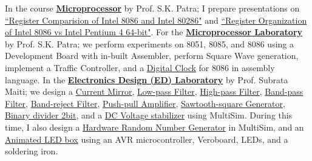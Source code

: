 In the course \textbf{\href{https://github.com/nitrece/microprocessor}{Microprocessor}} by Prof. S.K. Patra; I prepare presentations on \href{https://github.com/nitrece/microprocessor/blob/main/Presentations/01.%20Register%20Comparision%20of%20Intel%208086%20and%20Intel%2080286.pdf}{``Register Comparision of Intel 8086 and Intel 80286"} and \href{https://github.com/nitrece/microprocessor/blob/main/Presentations/02.%20Register%20Organization%20of%20Intel%208086%20vs%20Intel%20Pentium%204%2064-bit.pdf}{``Register Organization of Intel 8086 vs Intel Pentium 4 64-bit"}. For the \textbf{\href{https://github.com/nitrece/microprocessor-laboratory}{Microprocessor Laboratory}} by Prof. S.K. Patra; we perform experiments on 8051, 8085, and 8086 using a Development Board with in-built Assembler, perform Square Wave generation, implement a Traffic Controller, and a \href{https://github.com/electronicsf/digital-clock}{Digital Clock} for 8086 in assembly language. In the \textbf{\href{https://github.com/nitrece/electronics-design-laboratory}{Electronics Design (ED) Laboratory}} by Prof. Subrata Maiti; we design a \href{https://github.com/electronicsf/current-mirror}{Current Mirror}, \href{https://github.com/electronicsf/low-pass-filter}{Low-pass Filter}, \href{https://github.com/electronicsf/high-pass-filter}{High-pass Filter}, \href{https://github.com/electronicsf/band-pass-filter}{Band-pass Filter}, \href{https://github.com/electronicsf/band-reject-filter}{Band-reject Filter}, \href{https://github.com/electronicsf/push-pull-amplifier}{Push-pull Amplifier}, \href{https://github.com/electronicsf/sawtooth-square-generator}{Sawtooth-square Generator}, \href{https://github.com/electronicsf/binary-divider-2bit}{Binary divider 2bit}, and a \href{https://github.com/electronicsf/dc-voltage-stabilizer}{DC Voltage stabilizer} using MultiSim. During this time, I also design a \href{https://github.com/electronicsf/random-number-generator}{Hardware Random Number Generator} in MultiSim, and an \href{https://github.com/electronicsf/led-box}{Animated LED box} using an AVR microcontroller, Veroboard, LEDs, and a soldering iron.

